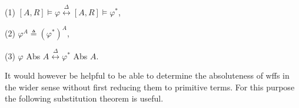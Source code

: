 (1) $[A, R] \models \varphi \overset{\Delta}{\leftrightarrow} [A, R] \models \varphi^*$,

(2) $\varphi^A \triangleq (\varphi^*)^A$,

(3) $\varphi$ Abs $A \overset{\Delta}{\leftrightarrow} \varphi^*$ Abs $A$.

It would however be helpful to be able to determine the absoluteness of wffs in the wider sense without first reducing them to primitive terms. For this purpose the following substitution theorem is useful.
